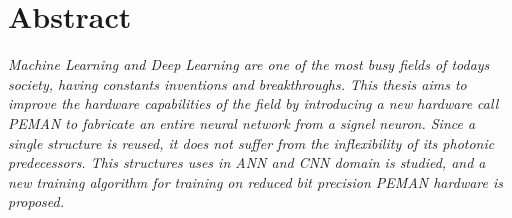 \newpage
\chapter*{\centering Abstract}
\textit{\quad
	Machine Learning and Deep Learning are one of the most busy fields of todays society, having constants inventions and breakthroughs. This thesis aims to improve the hardware capabilities of the field by introducing a new hardware call PEMAN to fabricate an entire neural network from a signel neuron. Since a single structure is reused, it does not suffer from the inflexibility of its photonic predecessors. This structures uses in ANN and CNN domain is studied, and a new training algorithm for training on reduced bit precision PEMAN hardware is proposed.
}

